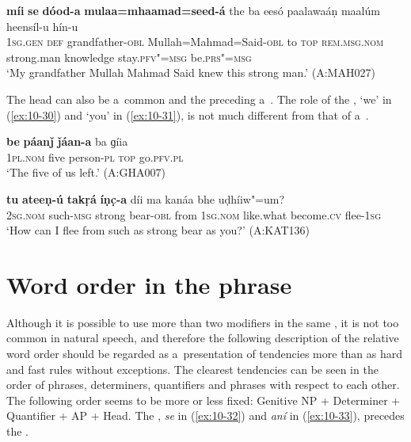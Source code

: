 \ea
\label{ex:10-29}
\gll \textbf{míi} \textbf{se} \textbf{dóod-a} \textbf{mulaa=mhaamad=seed-á} the ba eesó paalawaáṇ maalúm heensíl-u hín-u\\
\textsc{1sg.gen} \textsc{def} grandfather-\textsc{obl} Mullah=Mahmad=Said-\textsc{obl} to  \textsc{top} \textsc{rem.msg.nom} strong.man knowledge  stay.\textsc{pfv"=msg} be.\textsc{prs"=msg}\\
\glt `My grandfather Mullah Mahmad Said knew this strong man.' (A:MAH027)
\z


The head can also be a~common  and the preceding  a~. The role of the , `we' in (\ref{ex:10-30}) and `you' in (\ref{ex:10-31}), is not much different from that of a~. 

\begin{exe}
\ex
\label{ex:10-30}
\gll \textbf{be} \textbf{páanǰ} \textbf{ǰáan-a} ba ɡíia \\
\textsc{1pl.nom} five person-\textsc{pl} \textsc{top} go.\textsc{pfv.pl}  \\
\glt `The five of us left.' (A:GHA007)

\ex
\label{ex:10-31}
\gll \textbf{tu} \textbf{ateeṇ-ú} \textbf{takṛá} \textbf{íṇc̣-a} díi ma kanáa bhe uḍhíiw"=um? \\
\textsc{2sg.nom} such-\textsc{msg} strong bear-\textsc{obl} from \textsc{1sg.nom}  like.what become.\textsc{cv} flee-\textsc{1sg} \\
\glt `How can I flee from such as strong bear as you?' (A:KAT136)
\end{exe}

\section{Word order in the  phrase}
\label{sec:10-2}


Although it is possible to use more than two modifiers in the same  , it is not too common in natural speech, and therefore the following description of the relative word order should be regarded as a~presentation of tendencies more than as hard and fast rules without exceptions. The clearest tendencies can be seen in the order of  phrases, determiners, quantifiers and  phrases with respect to each other. The following order seems to be more or less fixed: Genitive NP + Determiner + Quantifier + AP + Head. The , \textit{se} in (\ref{ex:10-32}) and \textit{aní} in (\ref{ex:10-33}), precedes the .

